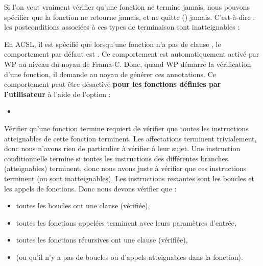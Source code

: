 

\begin{Information}
  Si l'on veut vraiment vérifier qu'une fonction ne termine jamais, nous pouvons
  spécifier que la fonction ne retourne jamais, et ne quitte ()
  jamais. C'est-à-dire : les postconditions associées à ces types de terminaison
  sont inatteignables :

\end{Information}


\begin{Information}
  En ACSL, il est spécifié que lorsqu'une fonction n'a pas de clause
  , le comportement par défaut est
  . Ce comportement est
  automatiquement activé par WP au niveau du noyau de Frama-C. Donc, quand WP
  démarre la vérification d'une fonction, il demande au noyau de générer ces
  annotations. Ce comportement peut être désactivé
  \textbf{pour les fonctions définies par l'utilisateur} à l'aide de l'option :
  \begin{itemize}
  \item {}
  \end{itemize}
\end{Information}




Vérifier qu'une fonction termine requiert de vérifier que toutes les instructions
atteignables de cette fonction terminent. Les affectations terminent trivialement,
donc nous n'avons rien de particulier à vérifier à leur sujet. Une instruction
conditionnelle termine si toutes les instructions des différentes branches
(atteignables) terminent, donc nous avons juste à vérifier que ces instructions
terminent (ou sont inatteignables). Les instructions restantes sont les boucles
et les appels de fonctions. Donc nous devons vérifier que :
\begin{itemize}
  \item toutes les boucles ont une clause  (vérifiée),
  \item toutes les fonctions appelées terminent avec leurs paramètres d'entrée,
  \item toutes les fonctions récursives ont une clause  (vérifiée),
  \item (ou qu'il n'y a pas de boucles ou d'appels atteignables dans la fonction).
\end{itemize}


